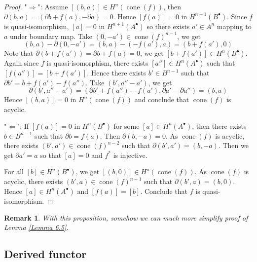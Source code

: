 \documentclass{ctexart}
\newtheorem{remark}{Remark}[section]
\newcommand{\cone}{\operatorname{cone}}
\begin{document}
\begin{proof}
    "$\Rightarrow$": Assume $[(b, a)]\in H^{n}(\cone(f))$, then $\partial (b, a) = (\partial b + f(a), -\partial a) = 0$.
    Hence $[f(a)] = 0$ in $H^{n + 1}(B^{\bullet})$.
    Since $f$ is quasi-isomorphism, $[a] = 0$ in $H^{n + 1}(A^{\bullet})$ so there exists $a'\in A^{n}$ mapping to $a$ under boundary map.
    Take $(0, -a')\in \cone(f)^{n - 1}$, we get
    \begin{equation}
        (b, a) - \partial (0, -a') = (b, a) - (-f(a'), a) = (b + f(a'), 0)
    \end{equation}
    Note that $\partial (b + f(a')) = \partial b + f(a) = 0$, we get $[b + f(a')]\in H^{n}(B^{\bullet})$.
    Again since $f$ is quasi-isomorphism, there exists $[a'']\in H^{n}(A^{\bullet})$ such that $[f(a'')] = [b + f(a')]$.
    Hence there exists $b'\in B^{n - 1}$ such that $\partial b' = b + f(a') - f(a'')$.
    Take $(b', a'' - a')$, we get
    \begin{equation}
        \partial (b', a'' - a') = (\partial b' + f(a'') - f(a'), \partial a' - \partial a'') = (b, a)
    \end{equation}
    Hence $[(b, a)] = 0$ in $H^{n}(\cone(f))$ and conclude that $\cone(f)$ is acyclic.
    \par
    "$\Leftarrow$": If $[f(a)] = 0$ in $H^{n}(B^{\bullet})$ for some $[a]\in H^{n}(A^{\bullet})$, then there exists $b\in B^{n - 1}$ such that $\partial b = f(a)$.
    Then $\partial (b, -a) = 0$.
    As $\cone(f)$ is acyclic, there exists $(b', a')\in \cone(f)^{n - 2}$ such that $\partial (b', a') = (b, -a)$.
    Then we get $\partial a' = a$ so that $[a] = 0$ and $f^{\ast}$ is injective.
    \par
    For all $[b]\in H^{n}(B^{\bullet})$, we get $[(b, 0)]\in H^{n}(\cone(f))$.
    As $\cone(f)$ is acyclic, there exists $(b', a)\in \cone(f)^{n - 1}$ such that $\partial (b', a) = (b, 0)$.
    Hence $[a]\in H^{n}(A^{\bullet})$ and $[f(a)] = [b]$.
    Conclude that $f$ is quasi-isomorphism.
\end{proof}
\begin{remark}
    With this proposition, somehow we can much more simplify proof of Lemma \ref{Lemma 6.5}.
\end{remark}

\subsection{Derived functor}
\label{subsection:Derived_Category_Derived_functor}
\end{document}
